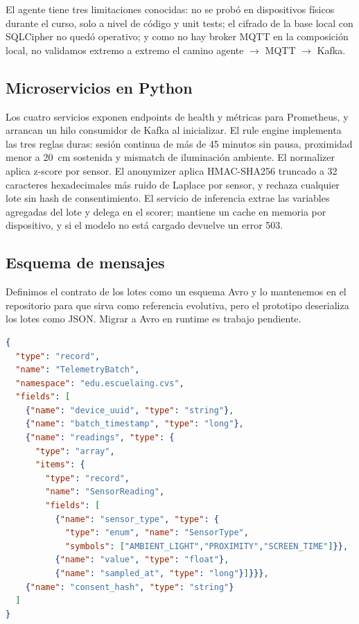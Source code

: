 \documentclass[conference]{IEEEtran}
\begin{document}
El agente tiene tres limitaciones conocidas: no se probó en 
dispositivos físicos durante el curso, solo a nivel de código y 
unit tests; el cifrado de la base local con SQLCipher no quedó 
operativo; y como no hay broker MQTT en la composición local, no 
validamos extremo a extremo el camino agente $\rightarrow$ MQTT 
$\rightarrow$ Kafka.

\subsection{Microservicios en Python}

Los cuatro servicios exponen endpoints de health y métricas para 
Prometheus, y arrancan un hilo consumidor de Kafka al inicializar. 
El rule engine implementa las tres reglas duras: sesión continua de 
más de 45 minutos sin pausa, proximidad menor a 20~cm sostenida y 
mismatch de iluminación ambiente. El normalizer aplica z-score por 
sensor. El anonymizer aplica HMAC-SHA256 truncado a 32 caracteres 
hexadecimales más ruido de Laplace por sensor, y rechaza cualquier 
lote sin hash de consentimiento. El servicio de inferencia extrae 
las variables agregadas del lote y delega en el scorer; mantiene un 
cache en memoria por dispositivo, y si el modelo no está cargado 
devuelve un error 503.

\subsection{Esquema de mensajes}

Definimos el contrato de los lotes como un esquema Avro y lo 
mantenemos en el repositorio para que sirva como referencia 
evolutiva, pero el prototipo deserializa los lotes como JSON. 
Migrar a Avro en runtime es trabajo pendiente.

\begin{lstlisting}[language=json, caption={Esquema Avro del lote
  de telemetría (contrato evolutivo).},
  basicstyle=\ttfamily\scriptsize]
{
  "type": "record",
  "name": "TelemetryBatch",
  "namespace": "edu.escuelaing.cvs",
  "fields": [
    {"name": "device_uuid", "type": "string"},
    {"name": "batch_timestamp", "type": "long"},
    {"name": "readings", "type": {
      "type": "array",
      "items": {
        "type": "record",
        "name": "SensorReading",
        "fields": [
          {"name": "sensor_type", "type": {
            "type": "enum", "name": "SensorType",
            "symbols": ["AMBIENT_LIGHT","PROXIMITY","SCREEN_TIME"]}},
          {"name": "value", "type": "float"},
          {"name": "sampled_at", "type": "long"}]}}},
    {"name": "consent_hash", "type": "string"}
  ]
}
\end{lstlisting}
\end{document}
